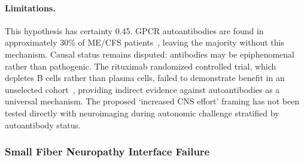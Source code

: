 \begin{hypothesis}
\paragraph{Limitations.}
This hypothesis has certainty 0.45. GPCR autoantibodies are found in approximately 30\% of ME/CFS patients~\cite{Loebel2016}, leaving the majority without this mechanism. Causal status remains disputed: antibodies may be epiphenomenal rather than pathogenic. The rituximab randomized controlled trial, which depletes B cells rather than plasma cells, failed to demonstrate benefit in an unselected cohort~\cite{Fluge2015rituximab_rct}, providing indirect evidence against autoantibodies as a universal mechanism. The proposed `increased CNS effort' framing has not been tested directly with neuroimaging during autonomic challenge stratified by autoantibody status.
\end{hypothesis}

\subsubsection{Small Fiber Neuropathy Interface Failure}

